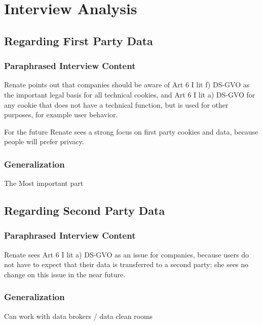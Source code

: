 %
%

\pagebreak
\section{Interview Analysis}

\onehalfspacing

\subsection{Regarding First Party Data}

\subsubsection{Paraphrased Interview Content}

Renate points out that companies should be aware of Art 6 I lit f) DS-GVO as the important legal basis for all technical cookies, and Art 6 I lit a) DS-GVO for any cookie that does not have a technical function, but is used for other purposes, for example user behavior.

For the future Renate sees a strong focus on first party cookies and data, because people will prefer privacy.

\subsubsection{Generalization}

The Most important part

\subsection{Regarding Second Party Data}

\subsubsection{Paraphrased Interview Content}

Renate sees Art 6 I lit a) DS-GVO as an issue for companies,  because users do not have to expect that their data is transferred to a second party; she sees no change on this issue in the near future.

\subsubsection{Generalization}

Can work with data brokers / data clean rooms


